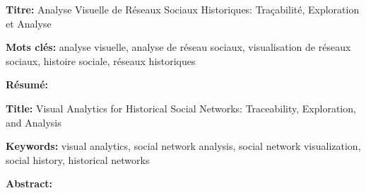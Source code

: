 \documentclass[12pt,a4paper, twoside]{book}
\begin{document}
    \small

    \begin{mdframed}[linecolor=Prune,linewidth=1]

        \textbf{Titre:} Analyse Visuelle de Réseaux Sociaux Historiques: Traçabilité, Exploration et Analyse

        \noindent \textbf{Mots clés:} analyse visuelle, analyse de réseau sociaux, visualisation de réseaux sociaux, histoire sociale, réseaux historiques

        \vspace{-.5cm}
        \begin{multicols}{2}
            \noindent \textbf{Résumé:} \abstractfr
        \end{multicols}

    \end{mdframed}

    \vspace{8mm}

    \begin{mdframed}[linecolor=Prune,linewidth=1]

        \textbf{Title:} Visual Analytics for Historical Social Networks: Traceability, Exploration, and Analysis

        \noindent \textbf{Keywords:} visual analytics, social network analysis, social network visualization, social history, historical networks

        \begin{multicols}{2}
            \noindent \textbf{Abstract:} \abstracteng
        \end{multicols}
    \end{mdframed}

    \titleformat{\chapter}[hang]{\bfseries\LARGE\color{Prune}}{\thechapter\quad}{.1ex}{}{}%
    \titlespacing{\chapter}{0pc}{0ex}{0.5pc}
\end{document}

